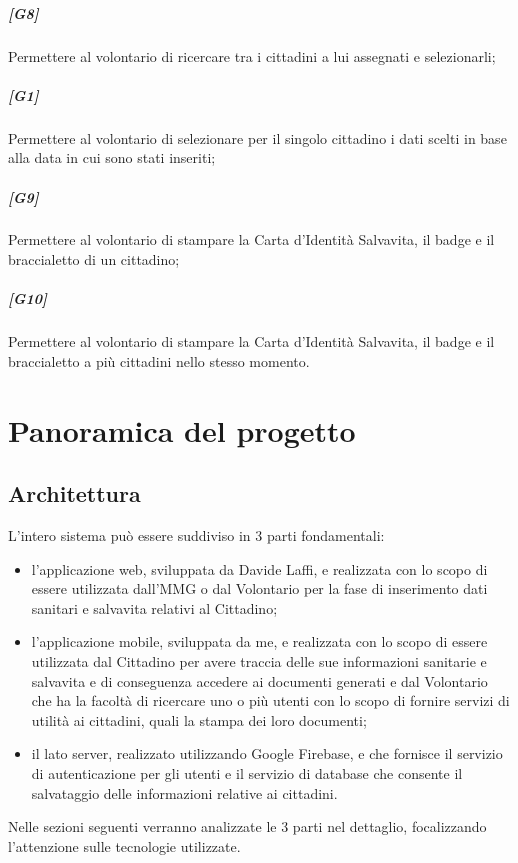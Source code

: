 \documentclass[12pt,a4paper,twoside,openright,titlepage]{book}
\begin{document}
\paragraph{[G8]} Permettere al volontario di ricercare tra i cittadini a lui assegnati e selezionarli;
\paragraph{[G1]} Permettere al volontario di selezionare per il singolo cittadino i dati scelti in base alla data in cui sono stati inseriti;
\paragraph{[G9]} Permettere al volontario di stampare la Carta d'Identità Salvavita, il badge e il braccialetto di un cittadino;
\paragraph{[G10]} Permettere al volontario di stampare la Carta d'Identità Salvavita, il badge e il braccialetto a più cittadini nello stesso momento.


\chapter{Panoramica del progetto}

\section{Architettura}
L'intero sistema può essere suddiviso in 3 parti fondamentali:
\begin{itemize}
\item l'applicazione web, sviluppata da Davide Laffi, e realizzata con lo scopo di essere utilizzata dall'MMG o dal Volontario per la fase di inserimento dati sanitari e salvavita relativi al Cittadino;
\item l'applicazione mobile, sviluppata da me, e realizzata con lo scopo di essere utilizzata dal Cittadino per avere traccia delle sue informazioni sanitarie e salvavita e di conseguenza accedere ai documenti generati e dal Volontario che ha la facoltà di ricercare uno o più utenti con lo scopo di fornire servizi di utilità ai cittadini, quali la stampa dei loro documenti;
\item il lato server, realizzato utilizzando Google Firebase, e che fornisce il servizio di autenticazione per gli utenti e il servizio di database che consente il salvataggio delle informazioni relative ai cittadini.
\end{itemize}
Nelle sezioni seguenti verranno analizzate le 3 parti nel dettaglio, focalizzando l'attenzione sulle tecnologie utilizzate.
\end{document}
